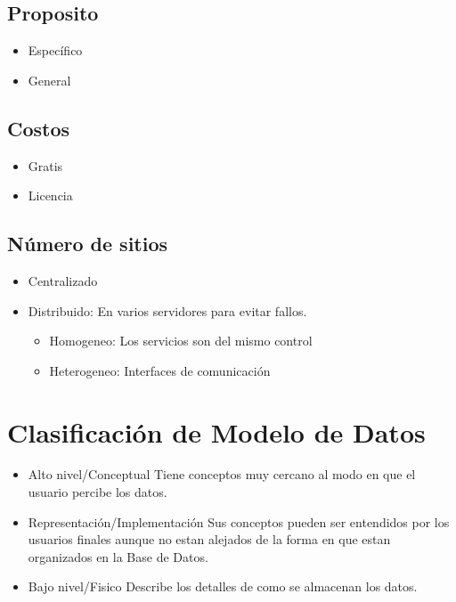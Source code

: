\documentclass[12pt, fleqn]{report}                             %
\theoremstyle{break}                                            %
\begin{document}
	\subsection{Proposito}
	\begin{itemize}
		\item Específico
		\item General
	\end{itemize}
	\subsection{Costos}
	\begin{itemize}
		\item Gratis
		\item Licencia
	\end{itemize}
	\subsection{Número de sitios}
	\begin{itemize}
		\item Centralizado
		\item Distribuido: En varios servidores para evitar fallos.
		\begin{itemize}
			\item Homogeneo: Los servicios son del mismo control
			\item Heterogeneo: Interfaces de comunicación
		\end{itemize}
	\end{itemize}
\section{Clasificación de Modelo de Datos}
\begin{itemize}
	\item Alto nivel/Conceptual Tiene conceptos muy cercano al modo en que el usuario percibe los datos.
	\item Representación/Implementación Sus conceptos pueden ser entendidos  por los usuarios finales aunque no estan alejados de la forma en que estan organizados en la Base de Datos.
	\item Bajo nivel/Fisico Describe los detalles de como se almacenan los datos.
\end{itemize}
\end{document}
